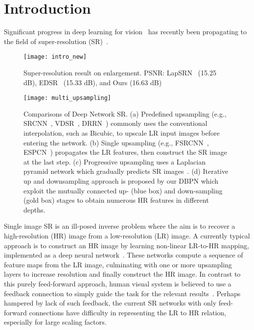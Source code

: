 \documentclass[10pt,twocolumn,letterpaper]{article}
\begin{document}
\section{Introduction}
Significant progress in deep learning for
vision~\cite{huang2017densely,he2015deep,denton2015deep,shrivastava2016learning,larsson2016fractalnet,radford2015unsupervised,IMKDB17}
has recently been propagating to the field of super-resolution (SR)~\cite{johnson2016perceptual,liao2015video,dong2016image,Haris17,kappeler2016video,Kim_2016_VDSR,LapSRN,Tai-DRRN-2017}. 
\begin{figure}[t]
\centering
\texttt{[image: intro\_new]}
\caption{Super-resolution result on  enlargement. PSNR: LapSRN~\cite{LapSRN} (15.25 dB), EDSR~\cite{Lim_2017_CVPR_Workshops} (15.33 dB), and Ours (16.63 dB)}
\label{figure:intro}
\end{figure}
\begin{figure*}
\centering
\texttt{[image: multi\_upsampling]}
\caption{Comparisons of Deep Network SR. (a) Predefined upsampling (e.g., SRCNN~\cite{dong2016image}, VDSR~\cite{Kim_2016_VDSR}, DRRN~\cite{Tai-DRRN-2017}) commonly uses the conventional interpolation, such as Bicubic, to upscale LR input images before entering the network. (b) Single upsampling (e.g., FSRCNN~\cite{dong2016accelerating}, ESPCN~\cite{shi2016real}) propagates the LR features, then construct the SR image at the last step. (c) Progressive upsampling uses a Laplacian pyramid network which gradually predicts SR images~\cite{LapSRN}. (d) Iterative up and downsampling approach is proposed by our DBPN which exploit the mutually connected up- (blue box) and down-sampling (gold box) stages to obtain numerous HR features in different depths.}
\label{figure:multi_upsampling}
\end{figure*}

Single image SR is an ill-posed inverse problem where the aim is to
recover a high-resolution (HR) image from a low-resolution (LR)
image. A currently typical approach is to construct an HR image by
learning non-linear LR-to-HR mapping, implemented as a deep neural
network~\cite{dong2016image, dong2016accelerating, shi2016real,
  LapSRN, Kim_2016_VDSR, kim2016deeply, Tai-DRRN-2017}. These networks
compute a sequence of feature maps from the LR image, culminating with
one or more upsampling layers to increase resolution and finally
construct the HR image. In contrast to this purely feed-forward
approach, human visual system is believed to use a feedback connection
to simply guide the task for the relevant
results~\cite{felleman1991distributed, kravitz2013ventral,
  lamme2000distinct}. Perhaps hampered by lack of such feedback,
the current SR networks with only feed-forward connections have difficulty in representing the LR to HR relation, especially for large scaling factors.
\end{document}
